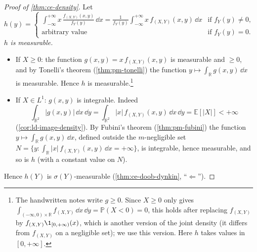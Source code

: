 \begin{proof}[Proof of \cref{thm:ce-density}]
Let
\[
  h(y)=\begin{cases}
    \displaystyle\int_{-\infty}^{+\infty}x\,\frac{f_{(X,Y)}(x,y)}{f_Y(y)}\,\dd x
    =\frac1{f_Y(y)}\int_{-\infty}^{+\infty}x\,f_{(X,Y)}(x,y)\,\dd x&\text{if }f_Y(y)\ne0,\\[1.2ex]
    \text{arbitrary value}&\text{if }f_Y(y)=0 .
  \end{cases}
\]
\emph{$h$ is measurable.}
\begin{itemize}
  \item If $X\ge0$: the function $g(x,y)=x\,f_{(X,Y)}(x,y)$ is measurable and $\ge0$, and by
    Tonelli's theorem (\cref{thm:pm-tonelli}) the function
    $y\mapsto\int_{\mathbb R}g(x,y)\,\dd x$ is measurable. Hence $h$ is measurable.\footnote{The
    handwritten notes write $g\ge0$. Since $X\ge0$ only gives
    $\int_{(-\infty,0)\times\mathbb R}f_{(X,Y)}\,\dd x\,\dd y=\mathbb P(X<0)=0$, this holds after
    replacing $f_{(X,Y)}$ by $f_{(X,Y)}\1_{[0,+\infty)}(x)$, which is another version of the
    joint density (it differs from $f_{(X,Y)}$ on a negligible set); we use this version.
    Here $h$ takes values in $[0,+\infty]$.}
  \item If $X\in L^1$: $g(x,y)$ is integrable. Indeed
    \[
      \int_{\mathbb R^2}|g(x,y)|\,\dd x\,\dd y=\int_{\mathbb R^2}|x|\,f_{(X,Y)}(x,y)\,\dd x\,\dd y=\mathbb E[|X|]<+\infty
    \]
    (\cref{cor:ld-image-density}). By Fubini's theorem (\cref{thm:pm-fubini}) the function
    $y\mapsto\int_{\mathbb R}g(x,y)\,\dd x$, defined outside the $m$-negligible set
    $N=\{y:\int_{\mathbb R}|x|\,f_{(X,Y)}(x,y)\,\dd x=+\infty\}$, is integrable, hence
    measurable, and so is $h$ (with a constant value on $N$).
\end{itemize}
Hence $h(Y)$ is $\sigma(Y)$-measurable (\cref{thm:ce-doob-dynkin}, ``$\Leftarrow$'').


\end{proof}

